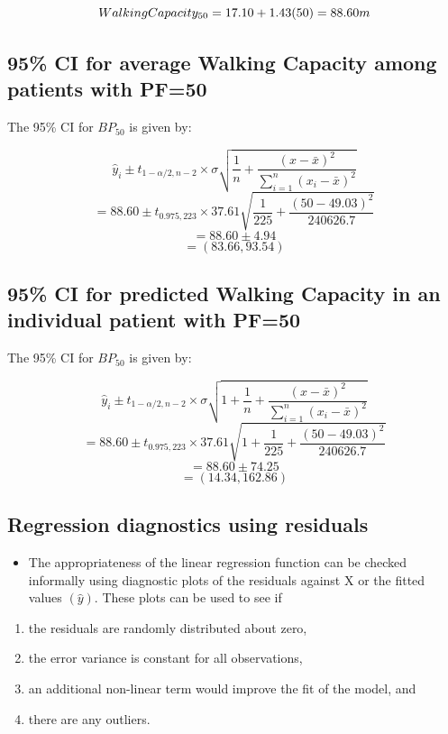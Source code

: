 \documentclass[
]{book}
\providecommand{\tightlist}{%
  \setlength{\itemsep}{0pt}\setlength{\parskip}{0pt}}
\begin{document}
\[Walking\space Capacity_{50}=17.10+1.43(50)=88.60\space m\]

\hypertarget{ci-for-average-walking-capacity-among-patients-with-pf50}{%
\subsection{95\% CI for average Walking Capacity among patients with PF=50}\label{ci-for-average-walking-capacity-among-patients-with-pf50}}

The 95\% CI for \(BP_{50}\) is given by:

\[\hat{y}_i\pm t_{1-\alpha/2,n-2}\times\sigma\sqrt{\frac{1}{n}+\frac{(x-\bar x)^2}{\sum_{i=1}^n(x_i-\bar x)^2}}\]
\[=88.60\pm t_{0.975,223}\times 37.61\sqrt{\frac{1}{225}+\frac{(50-49.03)^2}{240626.7}}\]
\[=88.60\pm4.94\]
\[=(83.66,93.54)\]

\hypertarget{ci-for-predicted-walking-capacity-in-an-individual-patient-with-pf50}{%
\subsection{95\% CI for predicted Walking Capacity in an individual patient with PF=50}\label{ci-for-predicted-walking-capacity-in-an-individual-patient-with-pf50}}

The 95\% CI for \(BP_{50}\) is given by:

\[\hat{y}_i\pm t_{1-\alpha/2,n-2}\times\sigma\sqrt{1+\frac{1}{n}+\frac{(x-\bar x)^2}{\sum_{i=1}^n(x_i-\bar x)^2}}\]
\[=88.60\pm t_{0.975,223}\times 37.61\sqrt{1+\frac{1}{225}+\frac{(50-49.03)^2}{240626.7}}\]
\[=88.60\pm74.25\]
\[=(14.34,162.86)\]

\hypertarget{regression-diagnostics-using-residuals}{%
\subsection{Regression diagnostics using residuals}\label{regression-diagnostics-using-residuals}}

\begin{itemize}
\tightlist
\item
  The appropriateness of the linear regression function can be checked informally using diagnostic plots of the residuals against X or the fitted values \((\hat{y})\). These plots can be used to see if\\
\end{itemize}

\begin{enumerate}
\def\labelenumi{\alph{enumi})}
\tightlist
\item
  the residuals are randomly distributed about zero,\\
\item
  the error variance is constant for all observations,\\
\item
  an additional non-linear term would improve the fit of the model, and\\
\item
  there are any outliers.
\end{enumerate}
\end{document}
